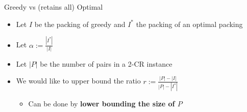 \begin{frame}{Greedy vs (retains all) Optimal}
\begin{itemize}


\item
Let $I$ be the packing of greedy and $I^*$ the packing of an optimal packing

\pause\item
Let $\alpha := \frac{|I^*|}{|I|}$ 

\pause\item
Let $|P|$ be the number of pairs in a 2-CR instance

\pause\item
We would like to upper bound the ratio $r := \frac{|P| - |I|}{|P| - |I^*|}$

\begin{itemize}
\pause\item
Can be done by \textbf{lower bounding the size of $P$}
\end{itemize}


\end{itemize}
\end{frame}